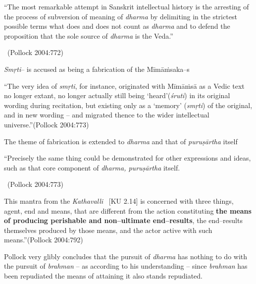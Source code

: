 \smallskip

\begin{myquote}
“The most remarkable attempt in Sanskrit intellectual history is the arresting of the process of subversion of meaning of \textit{dharma} by delimiting in the strictest possible terms what does and does not count as \textit{dharma} and to defend the proposition that the sole source of \textit{dharma} is the Veda.”

~\hfill (Pollock 2004:772)
\end{myquote}

\smallskip

\textit{Smṛti}– is accused as being a fabrication of the Mīmāṁsaka–s

\smallskip

\begin{myquote}
“The very idea of \textit{smṛti}, for instance, originated with Mīmāṁsā as a Vedic text no longer extant, no longer actually still being ‘heard’(\textit{śruti}) in its original wording during recitation, but existing only as a ‘memory’ (\textit{smṛti}) of the original, and in new wording – and migrated thence to the wider intellectual universe.”\hfill (Pollock 2004:773)
\end{myquote}

\medskip

The theme of fabrication is extended to \textit{dharma} and that of \textit{puruṣārtha} itself

\medskip

\begin{myquote}
“Precisely the same thing could be demonstrated for other expressions and ideas, such as that core component of \textit{dharma, puruṣārtha} itself.

~\hfill (Pollock 2004:773)
\end{myquote}

\begin{myquote}
This mantra from the \textit{Kathavalli}  [KU 2.14] is concerned with three things, agent, end and means, that are different from the action constituting \textbf{the means of producing perishable and non–ultimate end–results}, the end–results themselves produced by those means, and the actor active with such means.”\hfill (Pollock 2004:792)
\end{myquote}

Pollock very glibly concludes that the pursuit of \textit{dharma} has nothing to do with the pursuit of \textit{brahman} – as according to his understanding – since \textit{brahman} has been repudiated the means of attaining it also stands repudiated.

